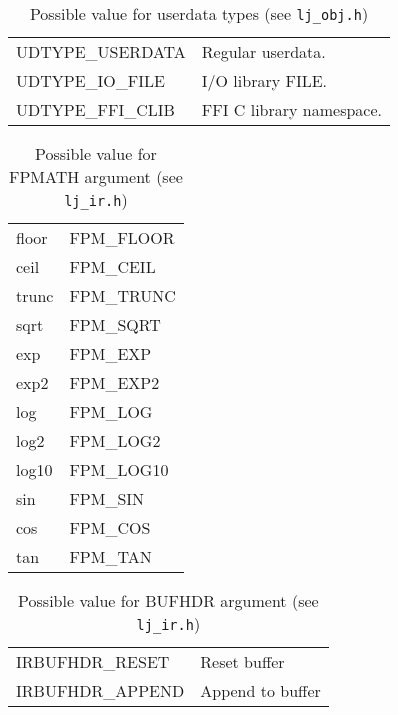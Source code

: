 \begin{table}[H]
\centering
\caption{
  Possible value for userdata types (see \texttt{lj\_obj.h})
}
\label{tab:dump-udata}
\begin{tabular}{|l|l|}
\hline
UDTYPE\_USERDATA  & Regular userdata.\\
UDTYPE\_IO\_FILE  & I/O library FILE.\\
UDTYPE\_FFI\_CLIB & FFI C library namespace.\\\hline
\end{tabular}
\end{table}

\begin{table}[H]
\centering
\caption{
  Possible value for FPMATH argument (see \texttt{lj\_ir.h})
}
\label{tab:dump-fpmath}
\begin{tabular}{|l|l|}
\hline
floor & FPM\_FLOOR \\
ceil  & FPM\_CEIL  \\
trunc & FPM\_TRUNC \\
sqrt  & FPM\_SQRT  \\
exp   & FPM\_EXP   \\
exp2  & FPM\_EXP2  \\
log   & FPM\_LOG   \\
log2  & FPM\_LOG2  \\
log10 & FPM\_LOG10 \\
sin   & FPM\_SIN   \\
cos   & FPM\_COS   \\
tan   & FPM\_TAN   \\
\hline
\end{tabular}
\end{table}

\begin{table}[H]
\centering
\caption{
  Possible value for BUFHDR argument (see \texttt{lj\_ir.h})}
\label{tab:dump-bufhdr}
\begin{tabular}{|l|l|}
\hline
IRBUFHDR\_RESET  & Reset buffer \\
IRBUFHDR\_APPEND & Append to buffer \\
\hline
\end{tabular}
\end{table}

